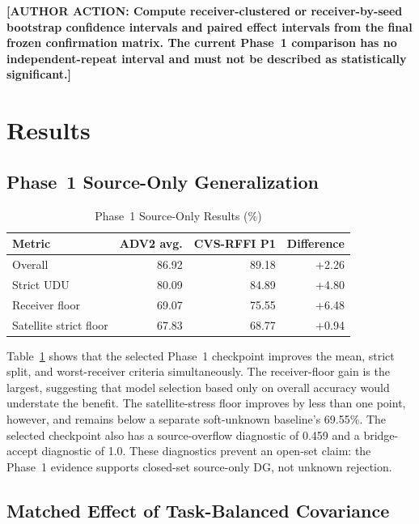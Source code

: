 \documentclass[journal]{IEEEtran}
\newcommand{\method}{CVS-RFFI}
\newcommand{\authoraction}[1]{\par\noindent\textbf{[AUTHOR ACTION: #1]}\par}
\begin{document}
\authoraction{Compute receiver-clustered or receiver-by-seed bootstrap confidence intervals and paired effect intervals from the final frozen confirmation matrix. The current Phase~1 comparison has no independent-repeat interval and must not be described as statistically significant.}

\section{Results}

\subsection{Phase~1 Source-Only Generalization}

\begin{table}[t]
\caption{Phase~1 Source-Only Results (\%)}
\label{tab:p1}
\centering
\footnotesize
\begin{tabular}{lrrr}
\toprule
Metric & ADV2 avg. & \method{} P1 & Difference \\
\midrule
Overall & 86.92 & 89.18 & +2.26 \\
Strict UDU & 80.09 & 84.89 & +4.80 \\
Receiver floor & 69.07 & 75.55 & +6.48 \\
Satellite strict floor & 67.83 & 68.77 & +0.94 \\
\bottomrule
\end{tabular}
\end{table}

Table~\ref{tab:p1} shows that the selected Phase~1 checkpoint improves the mean, strict split, and worst-receiver criteria simultaneously. The receiver-floor gain is the largest, suggesting that model selection based only on overall accuracy would understate the benefit. The satellite-stress floor improves by less than one point, however, and remains below a separate soft-unknown baseline's 69.55\%. The selected checkpoint also has a source-overflow diagnostic of 0.459 and a bridge-accept diagnostic of 1.0. These diagnostics prevent an open-set claim: the Phase~1 evidence supports closed-set source-only DG, not unknown rejection.

\subsection{Matched Effect of Task-Balanced Covariance}
\end{document}
